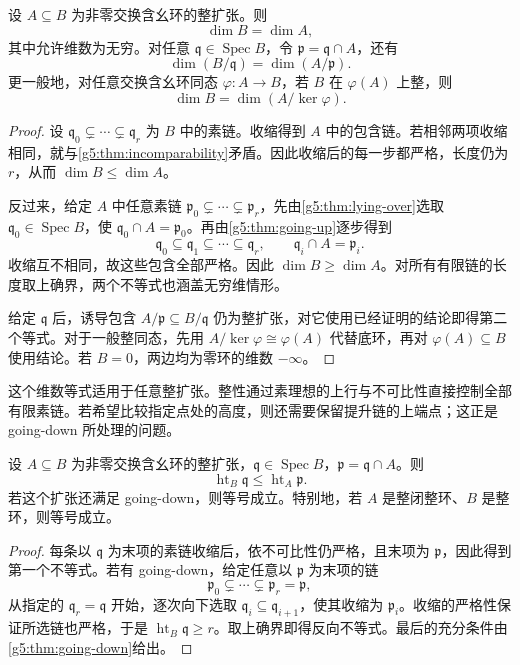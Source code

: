 \begin{theorem}\label{g5:thm:integral-dimension}
	设 \(A\subseteq B\) 为非零交换含幺环的整扩张。则
	\[
	\dim B=\dim A,
	\]
	其中允许维数为无穷。对任意 \(\mathfrak q\in\operatorname{Spec}B\)，令 \(\mathfrak p=\mathfrak q\cap A\)，还有
	\[
	\dim(B/\mathfrak q)=\dim(A/\mathfrak p).
	\]
	更一般地，对任意交换含幺环同态 \(\varphi:A\rightarrow B\)，若 \(B\) 在 \(\varphi(A)\) 上整，则
	\[
	\dim B=\dim(A/\ker\varphi).
	\]
\end{theorem}
\begin{proof}
	设 \(\mathfrak q_0\subsetneq\cdots\subsetneq\mathfrak q_r\) 为 \(B\) 中的素链。收缩得到 \(A\) 中的包含链。若相邻两项收缩相同，就与\cref{g5:thm:incomparability}矛盾。因此收缩后的每一步都严格，长度仍为 \(r\)，从而 \(\dim B\leq\dim A\)。

	反过来，给定 \(A\) 中任意素链 \(\mathfrak p_0\subsetneq\cdots\subsetneq\mathfrak p_r\)，先由\cref{g5:thm:lying-over}选取 \(\mathfrak q_0\in\operatorname{Spec}B\)，使 \(\mathfrak q_0\cap A=\mathfrak p_0\)。再由\cref{g5:thm:going-up}逐步得到
	\[
	\mathfrak q_0\subseteq\mathfrak q_1\subseteq\cdots\subseteq\mathfrak q_r,
	\qquad \mathfrak q_i\cap A=\mathfrak p_i.
	\]
	收缩互不相同，故这些包含全部严格。因此 \(\dim B\geq\dim A\)。对所有有限链的长度取上确界，两个不等式也涵盖无穷维情形。

	给定 \(\mathfrak q\) 后，诱导包含 \(A/\mathfrak p\subseteq B/\mathfrak q\) 仍为整扩张，对它使用已经证明的结论即得第二个等式。对于一般整同态，先用 \(A/\ker\varphi\cong\varphi(A)\) 代替底环，再对 \(\varphi(A)\subseteq B\) 使用结论。若 \(B=0\)，两边均为零环的维数 \(-\infty\)。
\end{proof}

这个维数等式适用于任意整扩张。整性通过素理想的上行与不可比性直接控制全部有限素链。若希望比较指定点处的高度，则还需要保留提升链的上端点；这正是 going-down 所处理的问题。

\begin{proposition}\label{g5:prop:integral-height-comparison}
	设 \(A\subseteq B\) 为非零交换含幺环的整扩张，\(\mathfrak q\in\operatorname{Spec}B\)，\(\mathfrak p=\mathfrak q\cap A\)。则
	\[
	\operatorname{ht}_B\mathfrak q\leq\operatorname{ht}_A\mathfrak p.
	\]
	若这个扩张还满足 going-down，则等号成立。特别地，若 \(A\) 是整闭整环、\(B\) 是整环，则等号成立。
\end{proposition}
\begin{proof}
	每条以 \(\mathfrak q\) 为末项的素链收缩后，依不可比性仍严格，且末项为 \(\mathfrak p\)，因此得到第一个不等式。若有 going-down，给定任意以 \(\mathfrak p\) 为末项的链
	\[
	\mathfrak p_0\subsetneq\cdots\subsetneq\mathfrak p_r=\mathfrak p,
	\]
	从指定的 \(\mathfrak q_r=\mathfrak q\) 开始，逐次向下选取 \(\mathfrak q_i\subseteq\mathfrak q_{i+1}\)，使其收缩为 \(\mathfrak p_i\)。收缩的严格性保证所选链也严格，于是 \(\operatorname{ht}_B\mathfrak q\geq r\)。取上确界即得反向不等式。最后的充分条件由\cref{g5:thm:going-down}给出。
\end{proof}

